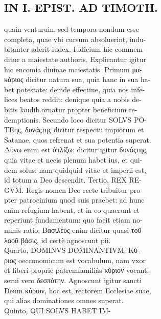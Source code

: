 \documentclass{article}
\begin{document}
\begin{pages}
\section*{IN I. EPIST. AD TIMOTH. \\
                }
quain venturuin, sed tempora nondum esse \\
                completa, quae vbi cursum absoluerint, indu- \\
                bitanter aderit iudex. Iudicium hic commem- \\
                ditur a maiestate authoris. Explicantur igitur \\
                hic encomia diuinae maiestatis. Primum μα- \\
                κάριος dicitur natura sua, quia hanc in sua ha- \\
                bet potestate: deinde effectiue, quia nos infe- \\
                lices beatos reddit: denique quia a nobis de- \\
                bitis laudib.ornatur propter beneficium re- \\
                demptionis. Secundo loco dicitur SOLVS PO- \\
                ΤEης, δυνάςτης dicitur respectu impiorum et \\
                Satanae, quos refrenat et sua potentia superat. \\
                Δύνω enim est ὁπλίζω: dicitur igitur δυνάςτης, \\
                quia vitae et necis plenum habet ius, et qui- \\
                dem solus: nam quidquid vitae et imperii est, \\
                id totum a Deo descendit. Tertio, REX RE- \\
                GVM. Regis nomen Deo recte tribuitur pro- \\
                pter patrocinium quod suis praebet: ad hunc \\
                enim refugium habent, et in eo quaerunt et \\
                reperiunt fundamentum: quo facit etiam no- \\
                minis ratio: Βασιλεὺς enim dicitur quasi τοῦ \\
                λαοῦ βάσις, id certè agnoscunt pii. \\
                Quarto, DOMINVS DOMINANTIVM: Κύ- \\
                ριος oecconomicum est vocabulum, nam vxor \\
                et liberi proprie patremfamiliâs κύριον vocant: \\
                serui vero δεσπότην. Agnoscunt igitur sancti \\
                Deum κύριον, hoc est, rectorem Ecclesiae suae, \\
                qui alias dominationes omnes superat. \\
                Quinto, QUI SOLVS HABET IM- \\
                

\end{pages}
\end{document}
